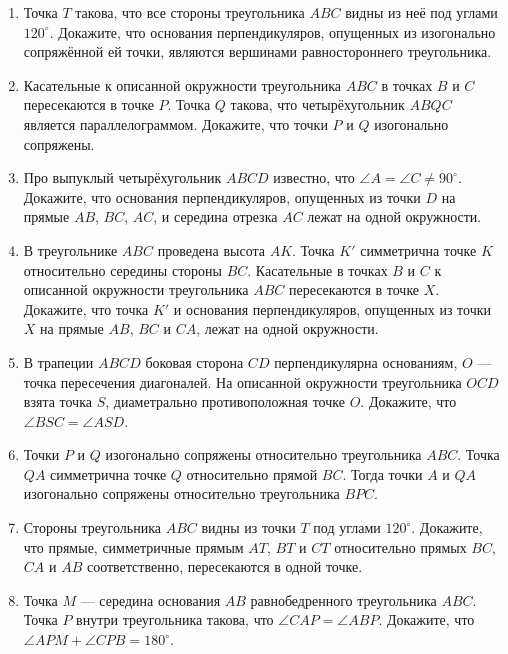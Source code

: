 \documentclass{article}
\begin{document}
\begin{enumerate}[label*=\protect\fbox{\arabic{enumi}}]

\item Точка $T$ такова, что все стороны треугольника $ABC$ видны из неё под углами $120^\circ$. Докажите, что основания перпендикуляров, опущенных из изогонально сопряжённой ей точки, являются вершинами равностороннего треугольника.

\item Касательные к описанной окружности треугольника $ABC$ в точках $B$ и $C$ пересекаются в точке $P$. Точка $Q$ такова, что четырёхугольник $ABQC$ является параллелограммом. Докажите, что точки $P$ и $Q$ изогонально сопряжены.

\item Про выпуклый четырёхугольник $ABCD$ известно, что $\angle A=\angle C\neq 90^\circ$. Докажите, что основания перпендикуляров, опущенных из точки $D$ на прямые $AB$, $BC$, $AC$, и середина отрезка $AC$ лежат на одной окружности.

\item  В треугольнике $ABC$ проведена высота $AK$. Точка $K'$ симметрична точке $K$ относительно середины стороны $BC$. Касательные в точках $B$ и $C$ к описанной окружности треугольника $ABC$ пересекаются в точке $X$. Докажите, что точка $K'$ и основания перпендикуляров, опущенных из точки $X$ на прямые $AB$, $BC$ и $CA$, лежат на одной окружности.

\item В трапеции $ABCD$ боковая сторона $CD$ перпендикулярна основаниям, $O$ — точка пересечения диагоналей. На описанной окружности треугольника $OCD$ взята точка $S$, диаметрально противоположная точке $O$. Докажите, что $\angle BSC=\angle ASD$.


\item Точки $P$ и $Q$ изогонально сопряжены относительно треугольника $ABC$. Точка $QA$ симметрична точке $Q$ относительно прямой $BC$. Тогда точки $A$ и $QA$ изогонально сопряжены относительно треугольника $BPC$.

\item Стороны треугольника $ABC$ видны из точки $T$ под углами $120^\circ$. Докажите, что прямые, симметричные прямым $AT$, $BT$ и $CT$ относительно прямых $BC$, $CA$ и $AB$ соответственно, пересекаются в одной точке.

\item Точка $M$ — середина основания $AB$ равнобедренного треугольника $ABC$. Точка $P$ внутри треугольника такова, что $\angle CAP=\angle ABP$. Докажите, что $\angle APM+\angle CPB=180^\circ$.



\end{enumerate}
\end{document}
